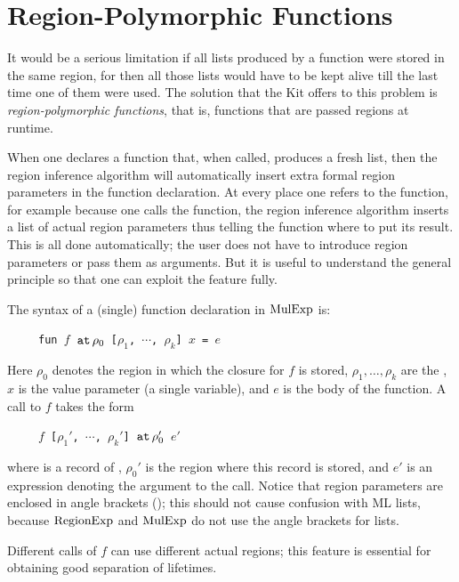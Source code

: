 \documentclass[12pt]{book}
\begin{document}
\section{Region-Polymorphic Functions}
It would be a serious limitation if 
all lists produced by a function were stored
in the same region, for then all those lists would have to be kept
alive till the last time one of them were used. The solution that the Kit
offers to this problem is {\em region-polymorphic functions}, that is, functions
that are passed regions at runtime. 

When one declares a function that, when called, produces
a fresh list, then the region inference algorithm will automatically insert extra
formal region parameters in the function declaration.
At every place one refers to the function, for example because one calls the function,
the region inference algorithm inserts
a list of actual region parameters thus telling the function where to put its
result. This is all done automatically; the user does not have to introduce
region parameters or pass them as arguments. But it is useful to understand
the general principle so that one can exploit the feature fully.

The syntax of a (single) function declaration in $\hbox{\rm MulExp}$ is:
\begin{tabbing}
\ \ \ \ \ \=\tt fun $f$ $\mathbin{\hbox{\tt at}}\,\rho_0$ [$\rho_1$, $\cdots$, $\rho_k$] $x$ = $e$
\end{tabbing}
Here $\rho_0$ denotes the region in which the closure for $f$ is stored,
$\rho_1, \ldots,\rho_k$ are 
the , $x$ is the
value parameter (a single variable), and $e$ is the body of the function.
A call to $f$ takes the form
\begin{tabbing}
\ \ \ \ \ \=\tt $f$  [$\rho_1'$, $\cdots$, $\rho_k'$] $\mathbin{\hbox{\tt at}}\,\rho_0'$ $e'$
\end{tabbing}
where  is a record of ,
$\rho_0'$ is the region where this record is stored, and $e'$ is an expression
denoting the argument to the call. Notice that region parameters are enclosed in angle brackets
(\boxml{[ ]}); this should not cause confusion with ML lists, because $\hbox{\rm RegionExp}$ and $\hbox{\rm MulExp}$
do not use the angle brackets for lists.

Different calls of $f$ can use different actual regions; this feature
is essential for obtaining good separation of lifetimes.
\end{document}
